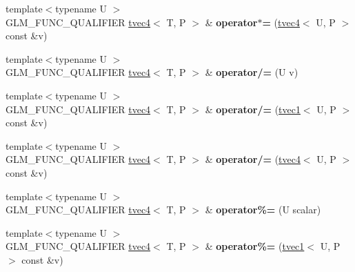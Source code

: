 \begin{DoxyCompactItemize}
\item 
\hypertarget{structglm_1_1tvec4_a6746eded03379870b12de89276141991}{{\footnotesize template$<$typename U $>$ }\\G\-L\-M\-\_\-\-F\-U\-N\-C\-\_\-\-Q\-U\-A\-L\-I\-F\-I\-E\-R \hyperlink{structglm_1_1tvec4}{tvec4}$<$ T, P $>$ \& {\bfseries operator$\ast$=} (\hyperlink{structglm_1_1tvec4}{tvec4}$<$ U, P $>$ const \&v)}\label{structglm_1_1tvec4_a6746eded03379870b12de89276141991}

\item 
\hypertarget{structglm_1_1tvec4_a96a9e5506adfa2d329a167ddc4990627}{{\footnotesize template$<$typename U $>$ }\\G\-L\-M\-\_\-\-F\-U\-N\-C\-\_\-\-Q\-U\-A\-L\-I\-F\-I\-E\-R \hyperlink{structglm_1_1tvec4}{tvec4}$<$ T, P $>$ \& {\bfseries operator/=} (U v)}\label{structglm_1_1tvec4_a96a9e5506adfa2d329a167ddc4990627}

\item 
\hypertarget{structglm_1_1tvec4_a75fde6792f702029d92cfb3502a7e8ea}{{\footnotesize template$<$typename U $>$ }\\G\-L\-M\-\_\-\-F\-U\-N\-C\-\_\-\-Q\-U\-A\-L\-I\-F\-I\-E\-R \hyperlink{structglm_1_1tvec4}{tvec4}$<$ T, P $>$ \& {\bfseries operator/=} (\hyperlink{structglm_1_1tvec1}{tvec1}$<$ U, P $>$ const \&v)}\label{structglm_1_1tvec4_a75fde6792f702029d92cfb3502a7e8ea}

\item 
\hypertarget{structglm_1_1tvec4_accd622c14fd14f612f8cb52e1d669163}{{\footnotesize template$<$typename U $>$ }\\G\-L\-M\-\_\-\-F\-U\-N\-C\-\_\-\-Q\-U\-A\-L\-I\-F\-I\-E\-R \hyperlink{structglm_1_1tvec4}{tvec4}$<$ T, P $>$ \& {\bfseries operator/=} (\hyperlink{structglm_1_1tvec4}{tvec4}$<$ U, P $>$ const \&v)}\label{structglm_1_1tvec4_accd622c14fd14f612f8cb52e1d669163}

\item 
\hypertarget{structglm_1_1tvec4_af438ebaf22a88b79e0db2a23738f6bb3}{{\footnotesize template$<$typename U $>$ }\\G\-L\-M\-\_\-\-F\-U\-N\-C\-\_\-\-Q\-U\-A\-L\-I\-F\-I\-E\-R \hyperlink{structglm_1_1tvec4}{tvec4}$<$ T, P $>$ \& {\bfseries operator\%=} (U scalar)}\label{structglm_1_1tvec4_af438ebaf22a88b79e0db2a23738f6bb3}

\item 
\hypertarget{structglm_1_1tvec4_abf42924fdc633b087a0bb2d91830fbce}{{\footnotesize template$<$typename U $>$ }\\G\-L\-M\-\_\-\-F\-U\-N\-C\-\_\-\-Q\-U\-A\-L\-I\-F\-I\-E\-R \hyperlink{structglm_1_1tvec4}{tvec4}$<$ T, P $>$ \& {\bfseries operator\%=} (\hyperlink{structglm_1_1tvec1}{tvec1}$<$ U, P $>$ const \&v)}\label{structglm_1_1tvec4_abf42924fdc633b087a0bb2d91830fbce}


\end{DoxyCompactItemize}
